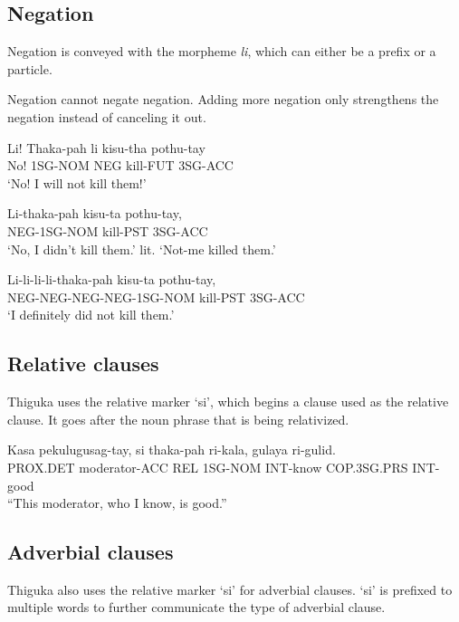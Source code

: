 \subsection{Negation}
Negation is conveyed with the morpheme \emph{li}, which can either be a prefix or a particle.

Negation cannot negate negation.
Adding more negation only strengthens the negation instead of canceling it out.

\begin{exe}
    \ex{} \gll{}Li! Thaka-pah li kisu-tha pothu-tay\\
    No! 1SG-NOM NEG kill-FUT 3SG-ACC\\
    \glt{}`No! I will not kill them!'
\end{exe}

\begin{exe}
    \ex{} \gll{}Li-thaka-pah kisu-ta pothu-tay,\\
    NEG-1SG-NOM kill-PST 3SG-ACC\\
    \glt{}`No, I didn't kill them.'
    \glt{}lit. `Not-me killed them.'
\end{exe}

\begin{exe}
    \ex{} \gll{}Li-li-li-li-thaka-pah kisu-ta pothu-tay,\\
    NEG-NEG-NEG-NEG-1SG-NOM kill-PST 3SG-ACC\\
    \glt{}`I definitely did not kill them.'
\end{exe}

\subsection{Relative clauses}
Thiguka uses the relative marker `si', which begins a clause used as the relative clause.
It goes after the noun phrase that is being relativized.

\begin{exe}
    \ex{} \gll{}Kasa     pekulugusag-tay, si  thaka-pah ri-kala, gulaya      ri-gulid.\\
                PROX.DET moderator-ACC    REL 1SG-NOM   INT-know COP.3SG.PRS INT-good \\
    \glt{}``This moderator, who I know, is good.''
\end{exe}

\subsection{Adverbial clauses}
Thiguka also uses the relative marker `si' for adverbial clauses. `si' is prefixed to
multiple words to further communicate the type of adverbial clause.

